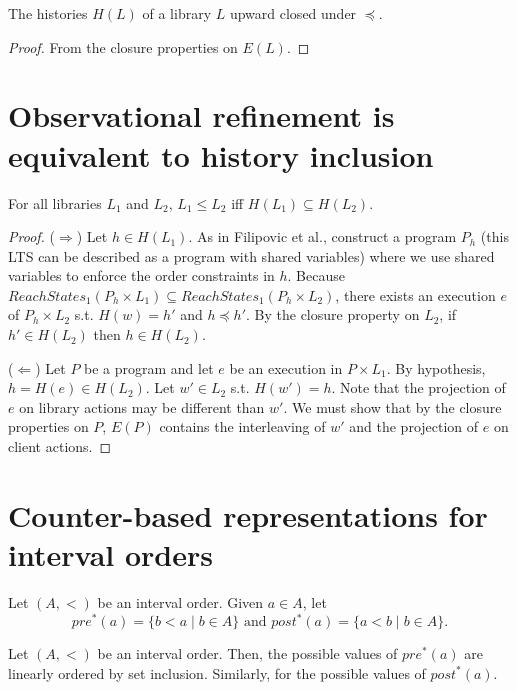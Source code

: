 \begin{lemma}
  
  The histories $H(L)$ of a library $L$ upward closed under $\preceq$.

\end{lemma}

\begin{proof}

  From the closure properties on $E(L)$.

\end{proof}

\section{Observational refinement is equivalent to history inclusion}

\begin{theorem}
For all libraries $L_1$ and $L_2$, 
$L_1 \leq L_2$ iff $H(L_1) \subseteq H(L_2)$.
\end{theorem}
\begin{proof}
($\Rightarrow$) Let $h\in H(L_1)$. As in Filipovic et al., construct a program $P_h$ (this LTS can be described as a program with shared variables) where we use shared variables to enforce the order constraints in $h$. Because $ReachStates_1(P_h\times L_1) \subseteq ReachStates_1(P_h\times L_2)$, there exists an execution $e$ of $P_h\times L_2$ s.t. $H(w)=h'$ and $h\preceq h'$. By the closure property on $L_2$, if $h'\in H(L_2)$ then $h\in H(L_2)$. 

($\Leftarrow$) Let $P$ be a program and let $e$ be an execution in $P\times L_1$. By hypothesis, $h=H(e)\in H(L_2)$. Let $w'\in L_2$ s.t. $H(w')=h$. Note that the projection of $e$ on library actions may be different than $w'$. We must show that by the closure properties on $P$, $E(P)$ contains the interleaving of $w'$ and the projection of $e$ on client actions.
\end{proof}

\section{Counter-based representations for interval orders}

Let $(A,<)$ be an interval order.
Given $a\in A$, let 
\[
pre^*(a)=\{b < a\mid b\in A\}\mbox{ and }post^*(a)=\{a < b\mid b\in A\}.
\]

\begin{lemma}
Let $(A,<)$ be an interval order. Then, the possible values of $pre^*(a)$ are linearly ordered by set inclusion. Similarly, for the possible values of $post^*(a)$.
\end{lemma}

